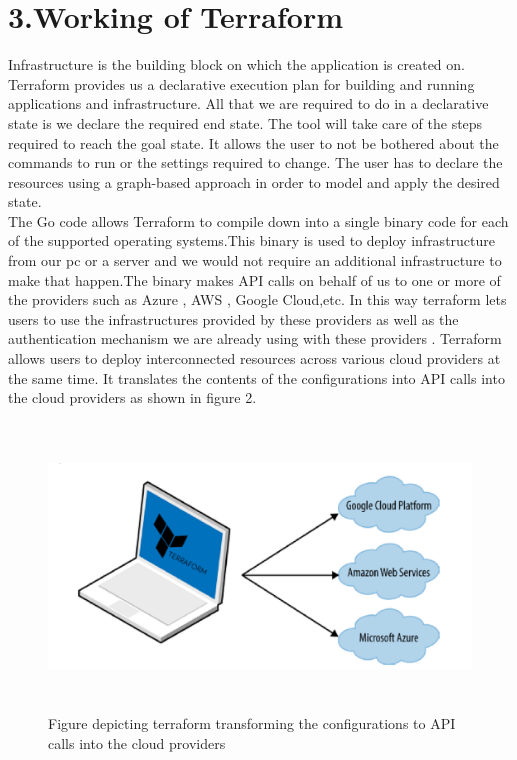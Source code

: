 \documentclass[9pt,twocolumn,twoside]{../../styles/osajnl}
\begin{document}
\section{3.Working of Terraform}
Infrastructure is the building block on which the application is
created on.  Terraform provides us a declarative execution plan for
building and running applications and infrastructure. All that we are
required to do in a declarative state is we declare the required end
state. The tool will take care of the steps required to reach the goal
state. It allows the user to not be bothered about the commands to run
or the settings required to change.  The user has to declare the
resources using a graph-based approach in order to model and apply the
desired state\cite{www-terraform-book}.\\ The Go code allows Terraform
to compile down into a single binary code for each of the supported
operating systems.This binary is used to deploy infrastructure from
our pc or a server and we would not require an additional
infrastructure to make that happen.The binary makes API calls on
behalf of us to one or more of the providers such as Azure , AWS ,
Google Cloud,etc. In this way terraform lets users to use the
infrastructures provided by these providers as well as the
authentication mechanism we are already using with these providers
\cite{www-terraform-upandrunning}. Terraform allows users to deploy
interconnected resources across various cloud providers at the same
time. It translates the contents of the configurations into API calls
into the cloud providers as shown in figure 2.


\begin{figure}[h]
  \begin{center}
\includegraphics[width=\linewidth,height=3in]{images/terraform_1}
\caption{Figure depicting terraform transforming the configurations to
  API calls into the cloud providers \cite{www-terraform-book}}
\label{fig:work}
\end{center}
\end{figure}
\end{document}
